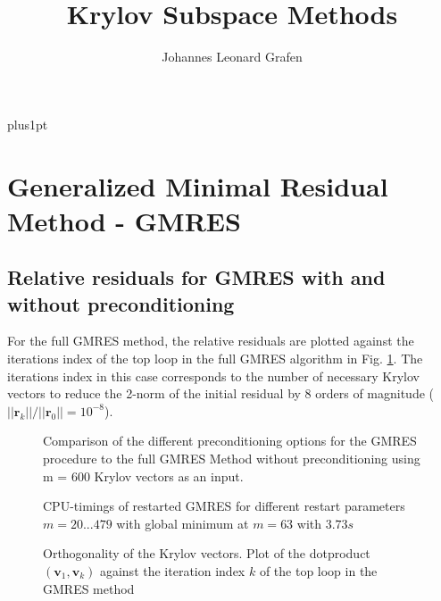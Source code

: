 \documentclass[11pt,a4paper]{article}
\title{Krylov Subspace Methods}
\author{Johannes Leonard Grafen}
\newcommand{\refFig}[1]{Fig. \ref{#1}}
\begin{document}
\renewcommand\baselinestretch{1.0}
\baselineskip=18pt plus1pt	
	
\maketitle
\tableofcontents
\listoffigures	%
\listoftables  %

\section{Generalized Minimal Residual Method - GMRES}
\label{chapter:GMRES}

\subsection{Relative residuals for GMRES with and without preconditioning}

For the full GMRES method, the relative residuals are plotted against the iterations index of the top loop in the full GMRES algorithm in \refFig{fig::Residuals}. The iterations index in this case corresponds to the number of necessary Krylov vectors to reduce the 2-norm of the initial residual by 8 orders of magnitude ($||\mathbf{r}_k|| / ||\mathbf{r}_0|| = 10^{-8}$). 
%
\begin{figure}[!htbp]
	\hspace*{0.8cm}
	\leavevmode
	\resizebox{1.0\width}{!}{}
	\caption{Comparison of the different preconditioning options for the GMRES procedure to the full GMRES Method without preconditioning using m = 600 Krylov vectors as an input.}
	\label{fig::Residuals}
\end{figure}
%
\begin{figure}[!htbp]
	\hspace*{0.8cm}
	\leavevmode
	\resizebox{1.0\width}{!}{}
	\caption{CPU-timings of restarted GMRES for different restart parameters $m = {20...479} $ with global minimum at $m = 63$ with $3.73 s$}
	\label{fig::Timings}
\end{figure}
%
\begin{figure}[!htbp]
	\hspace*{0.8cm}
	\leavevmode
	\resizebox{1.0\width}{!}{}
	\caption{Orthogonality of the Krylov vectors. Plot of the dotproduct $(\mathbf{v}_1, \mathbf{v}_k)$ against the iteration index $k$ of the top loop in the GMRES method}
	\label{fig::DotP}
\end{figure}
\end{document}
